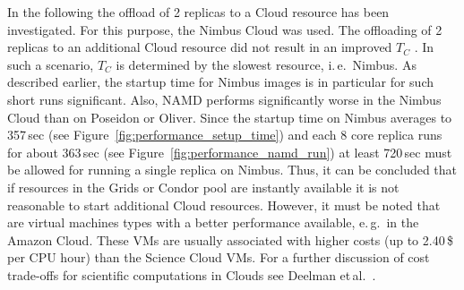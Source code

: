 \documentclass[conference,final]{IEEEtran}
\newcommand{\tc}{$T_{C}$ }
\begin{document}
In the following the offload of 2 replicas to a Cloud resource has
been investigated. For this purpose, the Nimbus Cloud was used. The
offloading of 2 replicas to an additional Cloud resource did not
result in an improved \tc. In such a scenario, \tc is determined by
the slowest resource, i.\,e.\ Nimbus. As described earlier, the
startup time for Nimbus images is in particular for such short runs
significant. Also, NAMD performs significantly worse in the Nimbus
Cloud than on Poseidon or Oliver. Since the startup time on Nimbus
averages to 357\,sec (see Figure~\ref{fig:performance_setup_time}) and
each 8 core replica runs for about 363\,sec (see
Figure~\ref{fig:performance_namd_run}) at least 720\,sec must be
allowed for running a single replica on Nimbus. Thus, it can be
concluded that if resources in the Grids or Condor pool are instantly
available it is not reasonable to start additional Cloud resources.
However, it must be noted that are virtual machines types with a
better performance available, e.\,g.\ in the Amazon Cloud. These VMs
are usually associated with higher costs (up to 2.40\,\$ per CPU hour)
than the Science Cloud VMs. For a further discussion of cost
trade-offs for scientific computations in Clouds see Deelman
et\,al.~\cite{1413421}.


\end{document}
